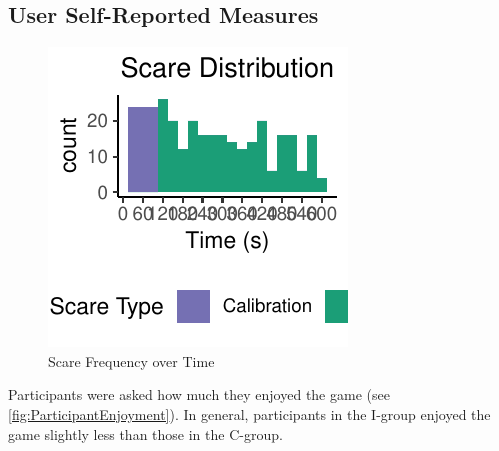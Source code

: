 \documentclass[12pt,a4paper]{article}\usepackage[]{graphicx}\usepackage[]{color}
\makeatletter
\def\maxwidth{ %
  \ifdim\Gin@nat@width>\linewidth
    \linewidth
  \else
    \Gin@nat@width
  \fi
}
\makeatother
\begin{document}
\subsection{User Self-Reported Measures}
\begin{figure}
	\vspace{-30pt}


{\centering \includegraphics[width=\maxwidth]{figure/ScareHistogram-1} 

}



	\caption{Scare Frequency over Time}
	\label{fig:ScareHistogram}
\end{figure}

Participants were asked how much they enjoyed the game (see \vref{fig:ParticipantEnjoyment}).
In general, participants in the I-group enjoyed the game slightly less than those in the C-group.
\end{document}
